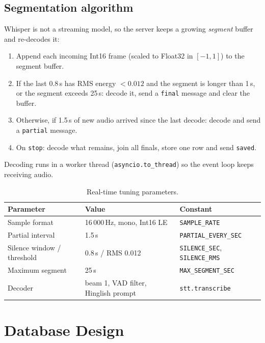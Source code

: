 \documentclass[11pt,a4paper]{article}
\begin{document}
\subsection{Segmentation algorithm}
Whisper is not a streaming model, so the server keeps a growing \emph{segment} buffer and re-decodes it:
\begin{enumerate}[leftmargin=*]
  \item Append each incoming Int16 frame (scaled to Float32 in $[-1,1]$) to the segment buffer.
  \item If the last 0.8\,s has RMS energy $< 0.012$ and the segment is longer than 1\,s, or the segment
        exceeds 25\,s: decode it, send a \texttt{final} message and clear the buffer.
  \item Otherwise, if 1.5\,s of new audio arrived since the last decode: decode and send a \texttt{partial} message.
  \item On \texttt{stop}: decode what remains, join all finals, store one row and send \texttt{saved}.
\end{enumerate}
Decoding runs in a worker thread (\texttt{asyncio.to\_thread}) so the event loop keeps receiving audio.

\begin{table}[H]
\centering
\begin{tabular}{@{}lll@{}}
\toprule
\textbf{Parameter} & \textbf{Value} & \textbf{Constant}\\
\midrule
Sample format & 16\,000\,Hz, mono, Int16 LE & \texttt{SAMPLE\_RATE}\\
Partial interval & 1.5\,s & \texttt{PARTIAL\_EVERY\_SEC}\\
Silence window / threshold & 0.8\,s / RMS 0.012 & \texttt{SILENCE\_SEC}, \texttt{SILENCE\_RMS}\\
Maximum segment & 25\,s & \texttt{MAX\_SEGMENT\_SEC}\\
Decoder & beam 1, VAD filter, Hinglish prompt & \texttt{stt.transcribe}\\
\bottomrule
\end{tabular}
\caption{Real-time tuning parameters.}
\end{table}

\section{Database Design}
\end{document}

